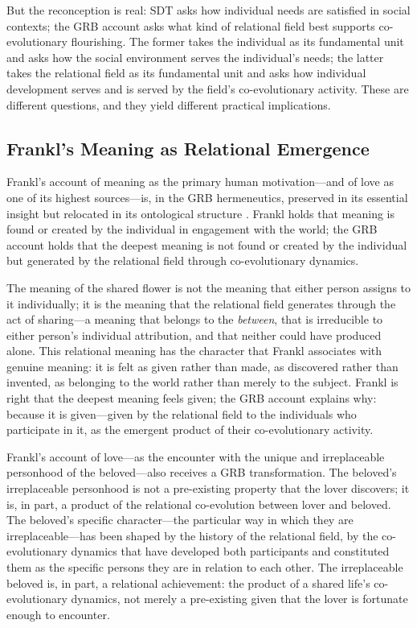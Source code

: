 But the reconception is real: SDT asks how individual needs are satisfied in social contexts; the GRB account asks what kind of relational field best supports co-evolutionary flourishing. The former takes the individual as its fundamental unit and asks how the social environment serves the individual's needs; the latter takes the relational field as its fundamental unit and asks how individual development serves and is served by the field's co-evolutionary activity. These are different questions, and they yield different practical implications.

\subsection{Frankl's Meaning as Relational Emergence}
\label{p14:subsec:frankl-grb}

\noindent
Frankl's account of meaning as the primary human motivation---and of love as one of its highest sources---is, in the GRB hermeneutics, preserved in its essential insight but relocated in its ontological structure \parencite{frankl1959}. Frankl holds that meaning is found or created by the individual in engagement with the world; the GRB account holds that the deepest meaning is not found or created by the individual but generated by the relational field through co-evolutionary dynamics.

The meaning of the shared flower is not the meaning that either person assigns to it individually; it is the meaning that the relational field generates through the act of sharing---a meaning that belongs to the \emph{between}, that is irreducible to either person's individual attribution, and that neither could have produced alone. This relational meaning has the character that Frankl associates with genuine meaning: it is felt as given rather than made, as discovered rather than invented, as belonging to the world rather than merely to the subject. Frankl is right that the deepest meaning feels given; the GRB account explains why: because it is given---given by the relational field to the individuals who participate in it, as the emergent product of their co-evolutionary activity.

Frankl's account of love---as the encounter with the unique and irreplaceable personhood of the beloved---also receives a GRB transformation. The beloved's irreplaceable personhood is not a pre-existing property that the lover discovers; it is, in part, a product of the relational co-evolution between lover and beloved. The beloved's specific character---the particular way in which they are irreplaceable---has been shaped by the history of the relational field, by the co-evolutionary dynamics that have developed both participants and constituted them as the specific persons they are in relation to each other. The irreplaceable beloved is, in part, a relational achievement: the product of a shared life's co-evolutionary dynamics, not merely a pre-existing given that the lover is fortunate enough to encounter.

